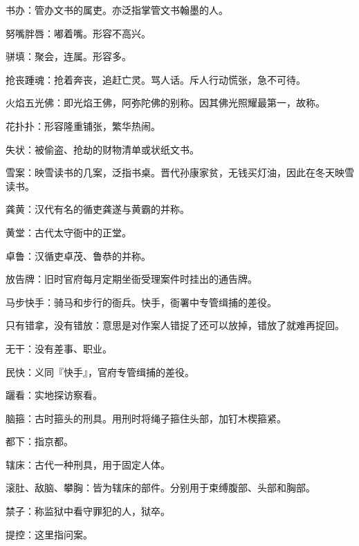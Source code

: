 \startbuffer[2439]
书办：管办文书的属吏。亦泛指掌管文书翰墨的人。
\stopbuffer


\startbuffer[2440]
努嘴胖唇：嘟着嘴。形容不高兴。
\stopbuffer


\startbuffer[2441]
骈填：聚会，连属。形容多。
\stopbuffer


\startbuffer[2442]
抢丧踵魂：抢着奔丧，追赶亡灵。骂人话。斥人行动慌张，急不可待。
\stopbuffer


\startbuffer[2443]
火焰五光佛：即光焰王佛，阿弥陀佛的别称。因其佛光照耀最第一，故称。
\stopbuffer


\startbuffer[2444]
花扑扑：形容隆重铺张，繁华热闹。
\stopbuffer


\startbuffer[2445]
失状：被偷盗、抢劫的财物清单或状纸文书。
\stopbuffer


\startbuffer[2446]
雪案：映雪读书的几案，泛指书桌。晋代孙康家贫，无钱买灯油，因此在冬天映雪读书。
\stopbuffer


\startbuffer[2447]
龚黄：汉代有名的循吏龚遂与黄霸的并称。
\stopbuffer


\startbuffer[2448]
黄堂：古代太守衙中的正堂。
\stopbuffer


\startbuffer[2449]
卓鲁：汉循吏卓茂、鲁恭的并称。
\stopbuffer


\startbuffer[2450]
放告牌：旧时官府每月定期坐衙受理案件时挂出的通告牌。
\stopbuffer


\startbuffer[2451]
马步快手：骑马和步行的衙兵。快手，衙署中专管缉捕的差役。
\stopbuffer


\startbuffer[2452]
只有错拿，没有错放：意思是对作案人错捉了还可以放掉，错放了就难再捉回。
\stopbuffer


\startbuffer[2453]
无干：没有差事、职业。
\stopbuffer


\startbuffer[2454]
民快：义同『快手』，官府专管缉捕的差役。
\stopbuffer


\startbuffer[2455]
躧看：实地探访察看。
\stopbuffer


\startbuffer[2456]
脑箍：古时箍头的刑具。用刑时将绳子箍住头部，加钉木楔箍紧。
\stopbuffer


\startbuffer[2457]
都下：指京都。
\stopbuffer


\startbuffer[2458]
辖床：古代一种刑具，用于固定人体。
\stopbuffer


\startbuffer[2459]
滚肚、敌脑、攀胸：皆为辖床的部件。分别用于束缚腹部、头部和胸部。
\stopbuffer


\startbuffer[2460]
禁子：称监狱中看守罪犯的人，狱卒。
\stopbuffer


\startbuffer[2461]
提控：这里指问案。
\stopbuffer


